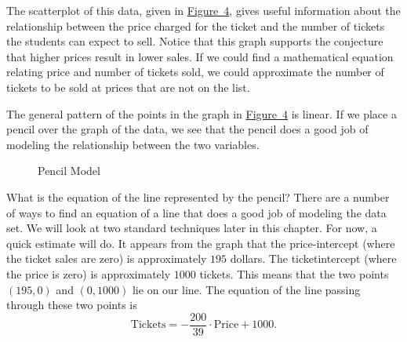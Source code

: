 \documentclass[10pt,]{book}
\theoremstyle{ptxdefinitionnotitle}
\theoremstyle{ptxdefinitiontitle}
\numberwithin{equation}{section}
\begin{document}
\hypertarget{p-22}{}%
The scatterplot of this data, given in \hyperref[scatterplot-of-the-ticket-data-summed]{Figure~4}, gives useful information about the relationship between the price charged for the ticket and the number of tickets the students can expect to sell. Notice that this graph supports the conjecture that higher prices result in lower sales. If we could find a mathematical equation relating price and number of tickets sold, we could approximate the number of tickets to be sold at prices that are not on the list.%
\par
\hypertarget{p-23}{}%
The general pattern of the points in the graph in \hyperref[scatterplot-of-the-ticket-data-summed]{Figure~4} is linear. If we place a pencil over the graph of the data, we see that the pencil does a good job of modeling the relationship between the two variables.%
\begin{figure}
\centering
{
}
\caption{Pencil Model\label{pencil-model}}
\end{figure}
\hypertarget{p-24}{}%
What is the equation of the line represented by the pencil? There are a number of ways to find an equation of a line that does a good job of modeling the data set. We will look at two standard techniques later in this chapter. For now, a quick estimate will do. It appears from the graph that the price-intercept (where the ticket sales are zero) is approximately \textdollar{}\(195\) dollars. The ticketintercept (where the price is zero) is approximately \(1000\) tickets. This means that the two points \((195,0)\) and \((0, 1000)\) lie on our line. The equation of the line passing through these two points is%
\begin{equation*}
\text{Tickets} = - \frac{200}{39} \cdot \text{Price} + 1000\text{.}
\end{equation*}
\end{document}
